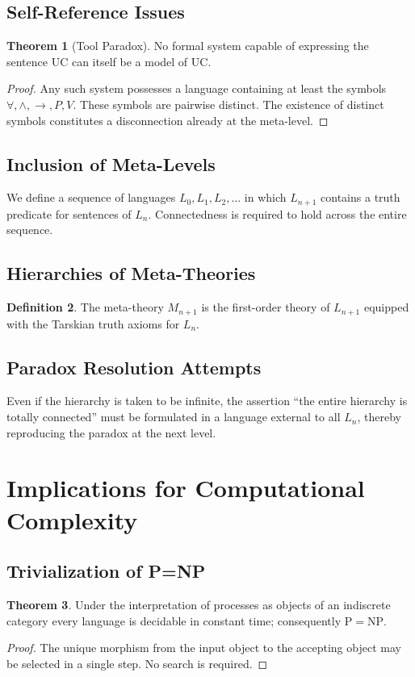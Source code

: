\documentclass[11pt,a4paper]{article}
\theoremstyle{definition}
\newtheorem{theorem}{Theorem}[section]
\newtheorem{definition}[theorem]{Definition}
\begin{document}
\subsection{Self-Reference Issues}
\begin{theorem}[Tool Paradox]
No formal system capable of expressing the sentence \(\mathrm{UC}\) can itself be a model of \(\mathrm{UC}\).
\end{theorem}
\begin{proof}
Any such system possesses a language containing at least the symbols \(\forall,\land,\to,P,V\). These symbols are pairwise distinct. The existence of distinct symbols constitutes a disconnection already at the meta-level.
\end{proof}

\subsection{Inclusion of Meta-Levels}
We define a sequence of languages \(L_0,L_1,L_2,\dots\) in which \(L_{n+1}\) contains a truth predicate for sentences of \(L_n\). Connectedness is required to hold across the entire sequence.

\subsection{Hierarchies of Meta-Theories}
\begin{definition}
The meta-theory \(M_{n+1}\) is the first-order theory of \(L_{n+1}\) equipped with the Tarskian truth axioms for \(L_n\).
\end{definition}

\subsection{Paradox Resolution Attempts}
Even if the hierarchy is taken to be infinite, the assertion “the entire hierarchy is totally connected” must be formulated in a language external to all \(L_n\), thereby reproducing the paradox at the next level.

\section{Implications for Computational Complexity}
\subsection{Trivialization of P=NP}
\begin{theorem}
Under the interpretation of processes as objects of an indiscrete category every language is decidable in constant time; consequently \(\mathrm{P}=\mathrm{NP}\).
\end{theorem}
\begin{proof}
The unique morphism from the input object to the accepting object may be selected in a single step. No search is required.
\end{proof}
\end{document}
